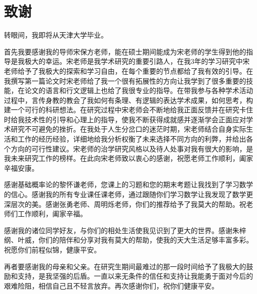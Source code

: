 
\chapter*{致\qquad 谢}

转眼间，我即将从天津大学毕业。

首先我要感谢我的导师宋保方老师，能在硕士期间能成为宋老师的学生得到他的指导是我极大的幸运。宋老师是我学术研究的重要引路人，在我3年的学习研究中宋老师给予了我极大的探索和学习自由，在每个重要的节点都给了我有效的引导。在我撰写第一篇论文时宋老师给了我一个很有拓展性的方向让我学到了很多重要的技能，在论文的语言和行文逻辑上也给了我很专业的指导。在带我参与各种学术活动过程中，言传身教的教会了我如何有条理、有逻辑的表达学术成果，如何思考，构建一个可行的科研想法。在研究过程中宋老师会不断地给我正面反馈并在研究卡住时给我技术性的引导和心理上的指导，使我不断获得成就感并逐渐学会正面应对学术研究不可避免的挫折。在我处于人生分岔口的迷茫时期，宋老师结合自身实际生活和工作的经历经验，详细地给我分析权衡了未来选择不同方向的利弊，并给出各个方向的可行性建议。宋老师的治学研究风格以及待人处事对我有很大的影响，是我未来研究工作的榜样。在此向宋老师致以衷心的感谢，祝愿老师工作顺利，阖家辛福安康。

感谢基础概率论的黎怀谦老师，您课上的习题和您的期末考题让我找到了学习数学的信心。感谢我的所有专业课任课老师，通过跟随你们学习数学让我发现了数学更深层次的美。感谢张勇老师、周明烁老师，你们的推荐给予了我莫大的帮助。祝老师们工作顺利，阖家辛福。

感谢我的诸位同学好友，与你们的相处生活使我见识到了更大的世界。感谢朱梓纲、叶威，你们的陪伴和分享对我有莫大的帮助，使我的天大生活足够丰富多彩。祝愿你们前程似锦，健康平安。

再者要感谢我的母亲和父亲。在研究生期间最难过的那一段时间给予了我极大的鼓励和支持，是我坚强的后盾。一直以来无条件的信任和支持让我能勇于面对今后的艰难险阻，相信自己且不轻言放弃。再次感谢你们，祝你们健康平安。